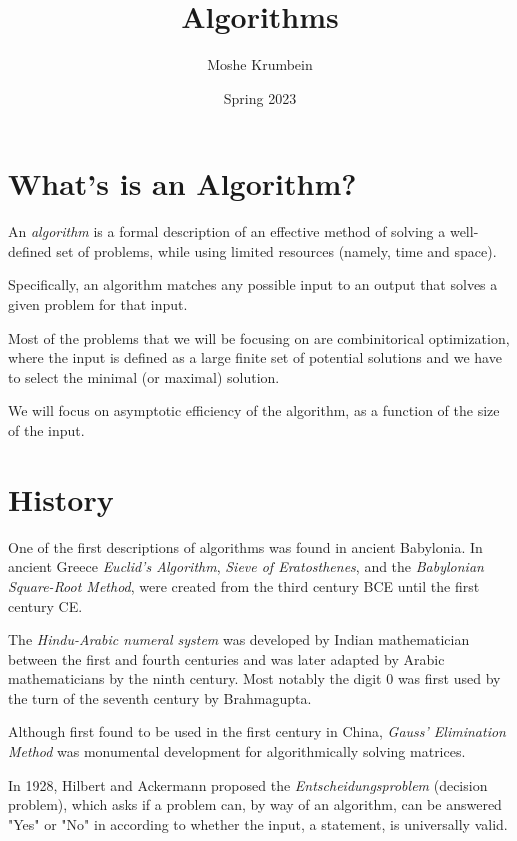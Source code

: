 \documentclass[00_complete]{subfiles}
\title{Algorithms}
\author{Moshe Krumbein}
\date{Spring 2023}
\begin{document}
\section{What's is an Algorithm?}
An \textit{algorithm} is a formal description of an effective method of solving
a well-defined set of problems, while using limited resources (namely, time and
space).

Specifically, an algorithm matches any possible input to an output that solves a
given problem for that input.

Most of the problems that we will be focusing on are combinitorical
optimization, where the input is defined as a large finite set of potential
solutions and we have to select the minimal (or maximal) solution.

We will focus on asymptotic efficiency of the algorithm, as a function of the
size of the input.

\section{History}
One of the first descriptions of algorithms was found in ancient Babylonia. In
ancient Greece \textit{Euclid's Algorithm}, \textit{Sieve of Eratosthenes}, and
the \textit{Babylonian Square-Root Method}, were created from the third century
BCE until the first century CE.

The \textit{Hindu-Arabic numeral system} was developed by Indian mathematician
between the first and fourth centuries and was later adapted by Arabic
mathematicians by the ninth century. Most notably the digit $0$ was first used
by the turn of the seventh century by Brahmagupta.

Although first found to be used in the first century in China, \textit{Gauss'
Elimination Method} was monumental development for algorithmically solving
matrices.

In 1928, Hilbert and Ackermann proposed the \textit{Entscheidungsproblem}
(decision problem), which asks if a problem can, by way of an algorithm, can be
answered "Yes" or "No" in according to whether the input, a statement, is
universally valid. 
\end{document}
